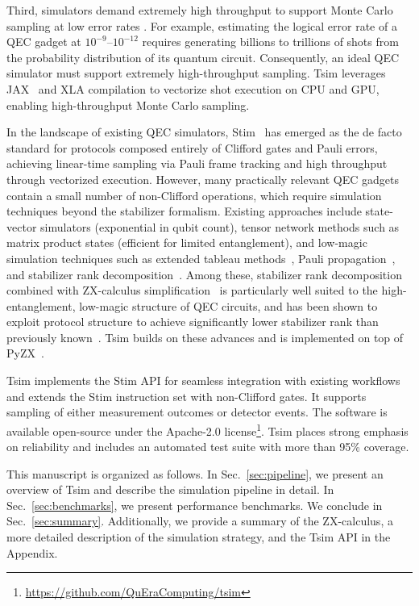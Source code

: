 \documentclass[
  a4paper,
  onecolumn,
  11pt,
  allowtoday
]{quantumarticle}
\begin{document}
Third, simulators demand extremely high throughput to support Monte Carlo sampling at low error rates \cite{gidney2021stim}. For example, estimating the logical error rate of a QEC gadget at $10^{-9}$--$10^{-12}$ requires generating billions to trillions of shots from the probability distribution of its quantum circuit. Consequently, an ideal QEC simulator must support extremely high-throughput sampling. Tsim leverages JAX~\cite{jax2018github} and XLA compilation to vectorize shot execution on CPU and GPU, enabling high-throughput Monte Carlo sampling.

In the landscape of existing QEC simulators, Stim~\cite{gidney2021stim} has emerged as the de facto standard for protocols composed entirely of Clifford gates and Pauli errors, achieving linear-time sampling via Pauli frame tracking and high throughput through vectorized execution. However, many practically relevant QEC gadgets contain a small number of non-Clifford operations, which require simulation techniques beyond the stabilizer formalism. Existing approaches include state-vector simulators (exponential in qubit count), tensor network methods such as matrix product states (efficient for limited entanglement), and low-magic simulation techniques such as extended tableau methods~\cite{yoder2012generalization,li2025soft}, Pauli propagation~\cite{rall2019simulation,rudolph2025pauli}, and stabilizer rank decomposition~\cite{bravyi2019simulation}. Among these, stabilizer rank decomposition combined with ZX-calculus simplification~\cite{kissinger2022classical,kissinger2022simulating,Sutcliffe_2025,sutcliffe2025novel,sutcliffe2024procedurally,codsi2022cutting} is particularly well suited to the high-entanglement, low-magic structure of QEC circuits, and has been shown to exploit protocol structure to achieve significantly lower stabilizer rank than previously known~\cite{wan2025cutting,wan2026simulatingmagicstatecultivation}. Tsim builds on these advances and is implemented on top of PyZX~\cite{kissinger2020Pyzx}.

Tsim implements the Stim API for seamless integration with existing workflows and extends the Stim instruction set with non-Clifford gates. It supports sampling of either measurement outcomes or detector events. The software is available open-source under the Apache-2.0 license\footnote{\url{https://github.com/QuEraComputing/tsim}}. Tsim places strong emphasis on reliability and includes an automated test suite with more than 95\% coverage.

This manuscript is organized as follows. In Sec.~\ref{sec:pipeline}, we present an overview of Tsim and describe the simulation pipeline in detail. In Sec.~\ref{sec:benchmarks}, we present performance benchmarks. We conclude in Sec.~\ref{sec:summary}. Additionally, we provide a summary of the ZX-calculus, a more detailed description of the simulation strategy, and the Tsim API in the Appendix.
\end{document}
